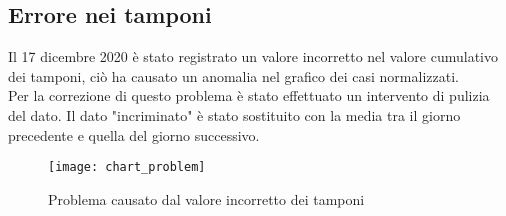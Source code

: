 \subsection{Errore nei tamponi}
Il 17 dicembre 2020 è stato registrato un valore incorretto nel valore cumulativo dei tamponi, ciò ha causato un anomalia nel grafico dei casi normalizzati.\\
Per la correzione di questo problema è stato effettuato un intervento di pulizia del dato.
Il dato "incriminato" è stato sostituito con la media tra il giorno precedente e quella del giorno successivo.
\begin{figure}[htp]
    \centering
    \texttt{[image: chart\_problem]}
    \caption{Problema causato dal valore incorretto dei tamponi}
\end{figure}


